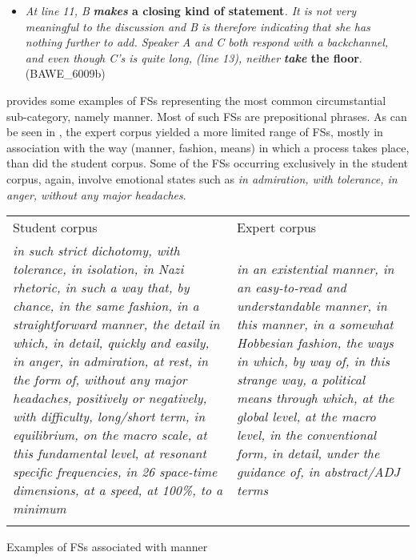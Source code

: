 \begin{itemize}
\item \begin{styleListParagraph}
\textit{At line 11, B} \textbf{\textit{makes} \textbf{a} \textbf{closing} \textbf{kind} \textbf{of} \textbf{statement}}\textit{. It is not very meaningful to the discussion and B is therefore indicating that she has nothing further to add. Speaker A and C both respond with a backchannel, and even though C’s is quite long, (line 13), neither} \textbf{\textit{take} \textbf{the} \textbf{floor}}. (BAWE\_6009b)
\end{styleListParagraph}
\end{itemize}

 provides some examples of FSs representing the most common circumstantial sub-category, namely manner. Most of such FSs are prepositional phrases. As can be seen in , the expert corpus yielded a more limited range of FSs, mostly in association with the way (manner, fashion, means) in which a process takes place, than did the student corpus. Some of the FSs occurring exclusively in the student corpus, again, involve emotional states such as \textit{in admiration, with tolerance, in anger, without any major headaches}. 


\begin{tabularx}{\textwidth}{XX}

\lsptoprule

Student corpus & Expert corpus\\
\textit{in such strict dichotomy, with tolerance, in isolation, in Nazi rhetoric, in such a way that, by chance, in the same fashion, in a straightforward manner, the detail in which, in detail, quickly and easily, in anger, in admiration, at rest, in the form of, without any major headaches, positively or negatively, with difficulty, long/short term, in equilibrium, on the macro scale, at this fundamental level, at resonant specific frequencies, in 26 space-time dimensions, at a speed, at 100\%, to a minimum} & \textit{in an existential manner, in an easy-to-read and understandable manner, in this manner, in a somewhat Hobbesian fashion, the ways in which, by way of, in this strange way, a political means through which, at the global level,  at the macro level, in the conventional form, in detail, under the guidance of, in abstract/ADJ terms}\\
\lspbottomrule
\end{tabularx}
\begin{table}
\caption{Examples of FSs associated with manner}
\label{tab:key:8}
\end{table}

